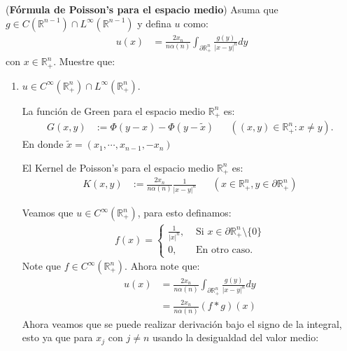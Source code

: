 \begin{homeworkProblem}
  (\textbf{Fórmula de Poisson's para el espacio medio}) Asuma que $g\in C(\mathbb{R}^{n-1}) \cap L^{\infty}(\mathbb{R}^{n-1})$ y defina $u$ como:
  \begin{align*}
    u(x)&=\frac{2x_n}{n\alpha(n)}\int_{\partial \mathbb{R}^{n}_{+}}\frac{g(y)}{|x-y|^n}dy
  \end{align*}
  con $x\in\mathbb{R}^{n}_{+}$. Muestre que:
  \begin{enumerate}
    \item $u\in C^{\infty}(\mathbb{R}^{n}_{+})\cap L^{\infty}(\mathbb{R}^{n}_{+})$.
    \begin{solucion}
      \begin{definicion}
        La función de Green para el espacio medio $\mathbb{R}^{n}_{+}$ es:
        \begin{align*}
          G(x,y)&:=\Phi(y-x)-\Phi(y-\tilde{x}) &&((x,y)\in\mathbb{R}^{n}_{+}:x\neq y).
        \end{align*}
        En donde $\tilde{x}=(x_1,\cdots,x_{n-1},-x_n)$
      \end{definicion}
      \begin{definicion}
        El Kernel de Poisson's para el espacio medio $\mathbb{R}^{n}_{+}$ es:
        \begin{align*}
          K(x,y)&:=\frac{2x_n}{n\alpha(n)}\frac{1}{|x-y|^n} &&(x\in \mathbb{R}^{n}_{+},y\in \partial\mathbb{R}^{n}_{+})
        \end{align*}
      \end{definicion}
      Veamos que $u\in C^{\infty}(\mathbb{R}^{n}_{+})$, para esto definamos:
      \begin{align*}
        f(x)= 
        \begin{cases}
          \frac{1}{|x|^n}, &\text{ Si } x\in\partial \mathbb{R}^{n}_{+}\setminus\{0\}\\
          0, &\text{ En otro caso.}
        \end{cases}
      \end{align*}
      Note que $f\in C^{\infty}(\mathbb{R}^{n}_{+})$. Ahora note que:
      \begin{align*}
        u(x)&=\frac{2x_n}{n\alpha(n)}\int_{\partial \mathbb{R}^{n}_{+}}\frac{g(y)}{|x-y|^n}dy\\
        &=\frac{2x_n}{n\alpha(n)}(f*g)(x)
      \end{align*}
      Ahora veamos que se puede realizar derivación bajo el signo de la integral, esto ya que para $x_j$ con $j\neq n$ usando la desigualdad del valor medio:

\end{solucion}
\end{enumerate}
\end{homeworkProblem}
